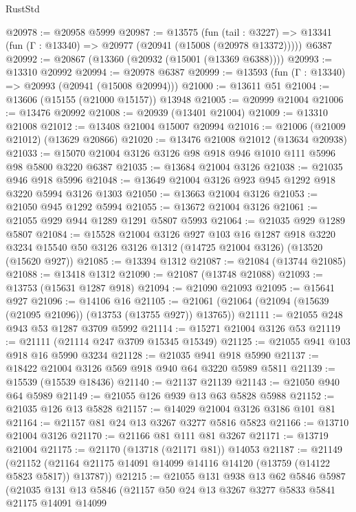 \begin{lexlean}{RustStd}
\begin{coremodule}
@20978 := @20958 @5999
@20987 := @13575
    (fun (tail : @3227) => @13341 (fun (Γ : @13340) => @20977 (@20941 (@15008 (@20978 @13372)))))
    @6387
@20992 := @20867 (@13360 (@20932 (@15001 (@13369 @6388))))
@20993 := @13310 @20992
@20994 := @20978 @6387
@20999 := @13593 (fun (Γ : @13340) => @20993 (@20941 (@15008 @20994)))
@21000 := @13611 @51
@21004 := @13606 (@15155 (@21000 @15157)) @13948
@21005 := @20999 @21004
@21006 := @13476 @20992
@21008 := @20939 (@13401 @21004)
@21009 := @13310 @21008
@21012 := @13408 @21004 @15007 @20994
@21016 := @21006 (@21009 @21012) (@13629 @20866)
@21020 := @13476 @21008 @21012 (@13634 @20938)
@21033 := @15070 @21004 @3126 @3126 @98 @918 @946 @1010 @111 @5996 @98 @5800 @3220 @6387
@21035 := @13684 @21004 @3126
@21038 := @21035 @946 @918 @5996
@21048 := @13649 @21004 @3126 @923 @945 @1292 @918 @3220 @5994 @3126 @1303
@21050 := @13663 @21004 @3126
@21053 := @21050 @945 @1292 @5994
@21055 := @13672 @21004 @3126
@21061 := @21055 @929 @944 @1289 @1291 @5807 @5993
@21064 := @21035 @929 @1289 @5807
@21084 := @15528
    @21004
    @3126
    @927
    @103
    @16
    @1287
    @918
    @3220
    @3234
    @15540
    @50
    @3126
    @3126
    @1312
    (@14725 @21004 @3126)
    (@13520 (@15620 @927))
@21085 := @13394 @1312
@21087 := @21084 (@13744 @21085)
@21088 := @13418 @1312
@21090 := @21087 (@13748 @21088)
@21093 := @13753 (@15631 @1287 @918)
@21094 := @21090 @21093
@21095 := @15641 @927
@21096 := @14106 @16
@21105 := @21061 (@21064 (@21094 (@15639 (@21095 @21096)) (@13753 (@13755 @927)) @13765))
@21111 := @21055 @248 @943 @53 @1287 @3709 @5992
@21114 := @15271 @21004 @3126 @53
@21119 := @21111 (@21114 @247 @3709 @15345 @15349)
@21125 := @21055 @941 @103 @918 @16 @5990 @3234
@21128 := @21035 @941 @918 @5990
@21137 := @18422 @21004 @3126 @569 @918 @940 @64 @3220 @5989 @5811
@21139 := @15539 (@15539 @18436)
@21140 := @21137 @21139
@21143 := @21050 @940 @64 @5989
@21149 := @21055 @126 @939 @13 @63 @5828 @5988
@21152 := @21035 @126 @13 @5828
@21157 := @14029 @21004 @3126 @3186 @101 @81
@21164 := @21157 @81 @24 @13 @3267 @3277 @5816 @5823
@21166 := @13710 @21004 @3126
@21170 := @21166 @81 @111 @81 @3267
@21171 := @13719 @21004
@21175 := @21170 (@13718 (@21171 @81)) @14053
@21187 := @21149
    (@21152 (@21164 @21175 @14091 @14099 @14116 @14120 (@13759 (@14122 @5823 @5817)) @13787))
@21215 := @21055
    @131
    @938
    @13
    @62
    @5846
    @5987
    (@21035
      @131
      @13
      @5846
      (@21157
        @50
        @24
        @13
        @3267
        @3277
        @5833
        @5841
        @21175
        @14091
        @14099

\end{coremodule}
\end{lexlean}
